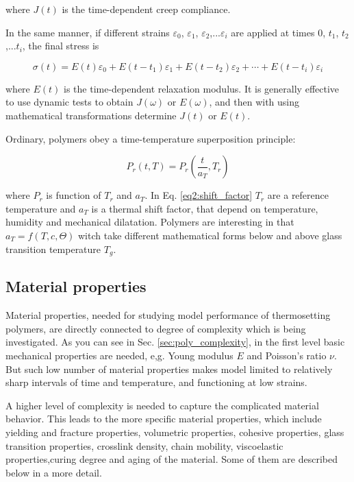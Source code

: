 \begin{itemize}
	where $J(t)$ is the time-dependent creep compliance.
	
	In the same manner, if different strains $\varepsilon_{0}$, $\varepsilon_{1}$, $\varepsilon_{2}$,...$\varepsilon_{i}$ are applied at times $0$, $t_{1}$, $t_{2}$,...$t_{i}$, the final stress is 
	
	\begin{equation}\label{eq2:boltzmann_sig}
	\sigma(t) = E(t)\varepsilon_{0} + E(t-t_{1})\varepsilon_{1}+ E(t-t_{2})\varepsilon_{2}+\cdots+E(t-t_{i})\varepsilon_{i}
	\end{equation}
	
	where $E(t)$ is the time-dependent relaxation modulus. It is generally effective to use dynamic tests to obtain $J(\omega)$ or $E(\omega)$, and then with using mathematical transformations determine $J(t)$ or $E(t)$.
	
	Ordinary, polymers obey a time-temperature superposition principle:
	
	\begin{equation}\label{eq2:shift_factor}
		P_{r}(t,T) = P_{r} \left(\dfrac{t}{a_{T}}, T_{r}\right)
	\end{equation}
	
	where $P_{r}$ is function of $T_{r}$ and $a_{T}$. In Eq. \ref{eq2:shift_factor} $T_{r}$ are a reference temperature and $a_{T}$ is a thermal shift factor, that depend on temperature, humidity and mechanical dilatation. Polymers are interesting in that $a_{T} = f(T, c, \Theta)$ witch take different mathematical forms below and above glass transition temperature $T_{g}$.
	
\end{itemize}


\subsection{Material properties}\label{subsec:mat_proper}
\indent

Material properties, needed for studying model performance of thermosetting polymers, are directly connected to degree of complexity which is being investigated. As you can see in Sec. \ref{sec:poly_complexity}, in the first level basic mechanical properties are needed, e,g. Young modulus $E$ and Poisson's ratio $\nu$. But such low number of material properties makes model limited to relatively sharp intervals of time and temperature, and functioning at low strains.

A higher level of complexity is needed to capture the complicated material behavior. This leads to the more specific material properties, which include yielding and fracture properties, volumetric properties, cohesive properties, glass transition properties, crosslink density, chain mobility, viscoelastic properties,curing degree and aging of the material. Some of them are described below in a more detail.	

